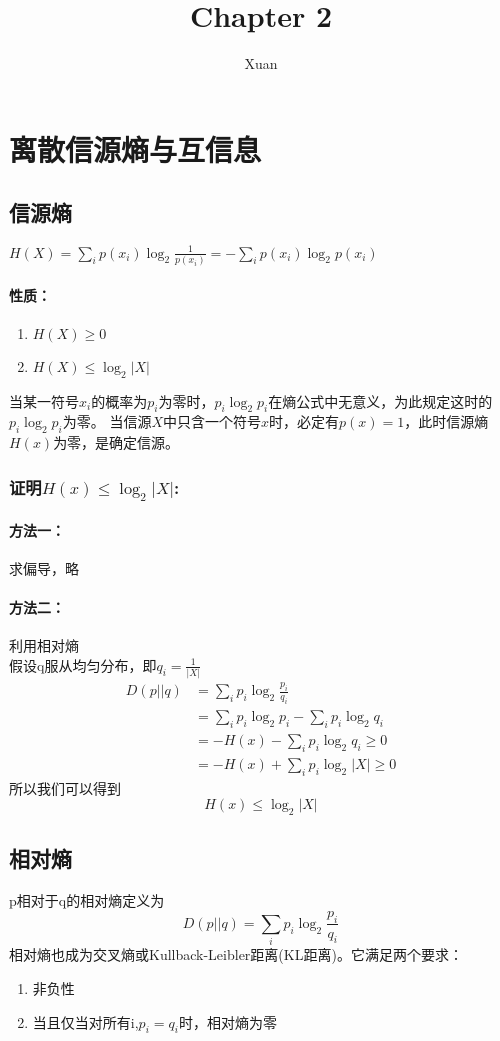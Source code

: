 \documentclass[a4paper, 12pt]{article}
\title{Chapter 2}
\author{Xuan}
\begin{document}
    \maketitle
    \section{离散信源熵与互信息}
    \subsection{信源熵}
    $H(X)=\sum_ip(x_i)\log_2\frac{1}{p(x_i)}=-\sum_ip(x_i)\log_2p(x_i)$
    \paragraph{性质：}
    \begin{enumerate}
        \item $H(X)\ge0$
        \item $H(X)\le\log_2|X|$
    \end{enumerate}
    当某一符号$x_i$的概率为$p_i$为零时，$p_i\log_2p_i$在熵公式中无意义，为此规定这时的$p_i\log_2p_i$为零。
    当信源$X$中只含一个符号$x$时，必定有$p(x)=1$，此时信源熵$H(x)$为零，是确定信源。
    \subsubsection{证明$H(x)\le\log_2|X|$:}
    \paragraph{方法一：} 求偏导，略
    \paragraph{方法二：} 利用相对熵\\
    假设q服从均匀分布，即$q_i=\frac{1}{|X|}$
    \begin{align}
        D(p||q)&=\sum_ip_i\log_2\frac{p_i}{q_i}\\
        &=\sum_ip_i\log_2p_i-\sum_ip_i\log_2q_i\\
        &=-H(x)-\sum_ip_i\log_2q_i\ge0\\
        &=-H(x)+\sum_ip_i\log_2|X|\ge0
    \end{align}
    所以我们可以得到
    \[H(x)\le\log_2|X|\]
    \subsection{相对熵}
    p相对于q的相对熵定义为
    \[D(p||q)=\sum_ip_i\log_2\frac{p_i}{q_i}\]
    相对熵也成为交叉熵或Kullback-Leibler距离(KL距离)。它满足两个要求：
    \begin{enumerate}
        \item 非负性
        \item 当且仅当对所有i,$p_i=q_i$时，相对熵为零
    \end{enumerate}
\end{document}
